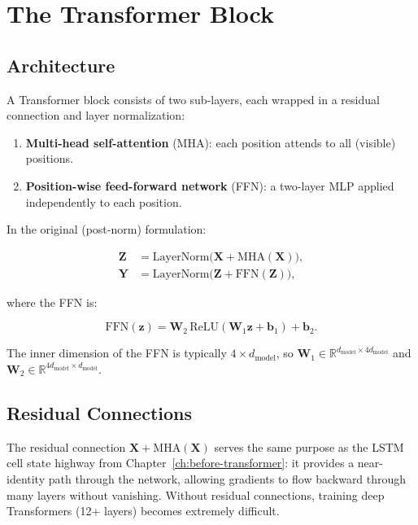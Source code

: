 \section{The Transformer Block}

\subsection{Architecture}

A Transformer block consists of two sub-layers, each wrapped in a residual connection and layer normalization:

\begin{enumerate}
    \item \textbf{Multi-head self-attention} (MHA): each position attends to all (visible) positions.
    \item \textbf{Position-wise feed-forward network} (FFN): a two-layer MLP applied independently to each position.
\end{enumerate}

In the original (post-norm) formulation:

\begin{align}
\mathbf{Z} &= \text{LayerNorm}\!\big(\mathbf{X} + \text{MHA}(\mathbf{X})\big), \\
\mathbf{Y} &= \text{LayerNorm}\!\big(\mathbf{Z} + \text{FFN}(\mathbf{Z})\big),
\end{align}

where the FFN is:

\[
\text{FFN}(\mathbf{z}) = \mathbf{W}_2\, \text{ReLU}(\mathbf{W}_1 \mathbf{z} + \mathbf{b}_1) + \mathbf{b}_2.
\]

The inner dimension of the FFN is typically $4 \times d_{\text{model}}$, so $\mathbf{W}_1 \in \mathbb{R}^{d_{\text{model}} \times 4d_{\text{model}}}$ and $\mathbf{W}_2 \in \mathbb{R}^{4d_{\text{model}} \times d_{\text{model}}}$.

\subsection{Residual Connections}

The residual connection $\mathbf{X} + \text{MHA}(\mathbf{X})$ serves the same purpose as the LSTM cell state highway from Chapter~\ref{ch:before-transformer}: it provides a near-identity path through the network, allowing gradients to flow backward through many layers without vanishing. Without residual connections, training deep Transformers (12+ layers) becomes extremely difficult.


